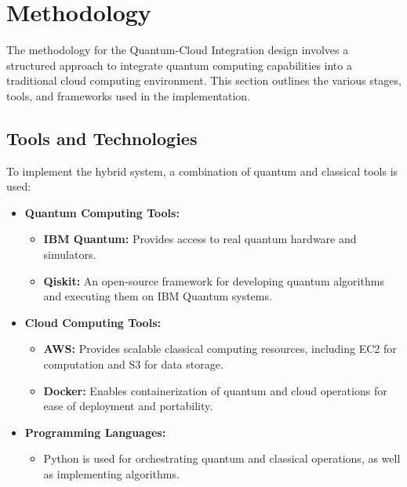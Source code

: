 \documentclass[conference]{IEEEtran}
\begin{document}
\section{Methodology}
The methodology for the Quantum-Cloud Integration design involves a structured approach to integrate quantum computing capabilities into a traditional cloud computing environment. This section outlines the various stages, tools, and frameworks used in the implementation.

\subsection{Tools and Technologies}
To implement the hybrid system, a combination of quantum and classical tools is used:
\begin{itemize}
    \item \textbf{Quantum Computing Tools:}
    \begin{itemize}
        \item \textbf{IBM Quantum:} Provides access to real quantum hardware and simulators.
        \item \textbf{Qiskit:} An open-source framework for developing quantum algorithms and executing them on IBM Quantum systems.
    \end{itemize}
    \item \textbf{Cloud Computing Tools:}
    \begin{itemize}
        \item \textbf{AWS:} Provides scalable classical computing resources, including EC2 for computation and S3 for data storage.
        \item \textbf{Docker:} Enables containerization of quantum and cloud operations for ease of deployment and portability.
    \end{itemize}
    \item \textbf{Programming Languages:}
    \begin{itemize}
        \item Python is used for orchestrating quantum and classical operations, as well as implementing algorithms.
    \end{itemize}
\end{itemize}
\end{document}
